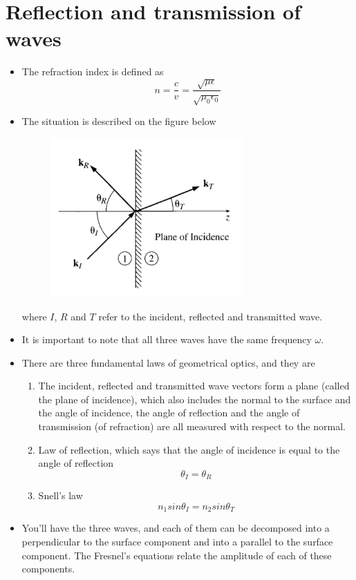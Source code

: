 \documentclass[oneside, 12pt]{book}
\begin{document}
\section{Reflection and transmission of waves}
\begin{itemize}
    \item The refraction index is defined as
    $$n = \frac{c}{v} = \frac{\sqrt{\mu \epsilon}}{\sqrt{\mu_ 0 \epsilon_0}}$$
    \item The situation is described on the figure below
    \begin{figure}[H]
    \centering
    \includegraphics[width=0.7\textwidth]{griffithselectro_fig_9-14}
    \end{figure}
    where $I$, $R$ and $T$ refer to the incident, reflected and transmitted wave.
    \item It is important to note that all three waves have the same frequency $\omega$.
    \item There are three fundamental laws of geometrical optics, and they are
    \begin{enumerate}
        \item The incident, reflected and transmitted wave vectors form a plane (called the plane of incidence), which also includes the normal to the surface and the angle of incidence, the angle of reflection and the angle of transmission (of refraction) are all measured with respect to the normal.
        \item Law of reflection, which says that the angle of incidence is equal to the angle of reflection
        $$\theta_I = \theta_R$$
        \item Snell's law 
        $$n_1 sin\theta_I = n_2 sin\theta_T$$
    \end{enumerate}
    \item You'll have the three waves, and each of them can be decomposed into a perpendicular to the surface component and into a parallel to the surface component. The Fresnel's equations relate the amplitude of each of these components.

\end{itemize}
\end{document}
